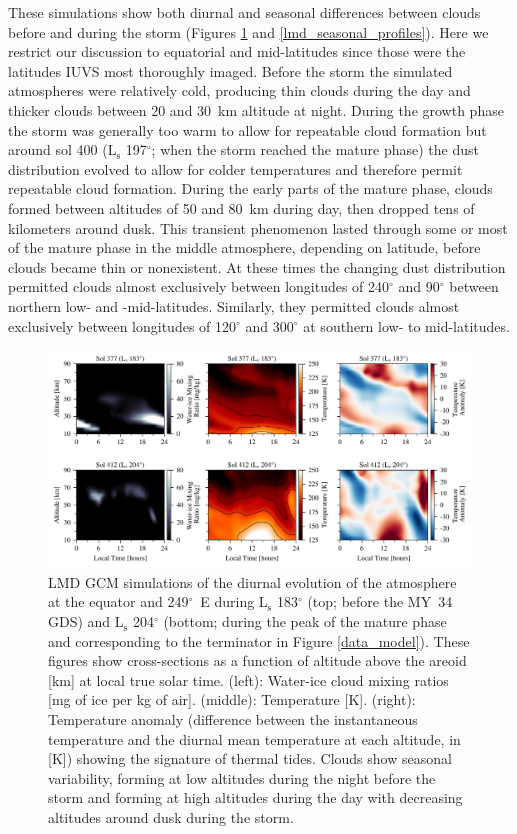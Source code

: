 \documentclass[draft]{agujournal2019}
\begin{document}
These simulations show both diurnal and seasonal differences between clouds before and during the storm (Figures \ref{lmd_diurnal_profiles} and \ref{lmd_seasonal_profiles}). Here we restrict our discussion to equatorial and mid-latitudes since those were the latitudes IUVS most thoroughly imaged. Before the storm the simulated atmospheres were relatively cold, producing thin clouds during the day and thicker clouds between 20 and 30~km altitude at night. During the growth phase the storm was generally too warm to allow for repeatable cloud formation but around sol 400 ($\mathrm{L_s}$ 197$^\circ$; when the storm reached the mature phase) the dust distribution evolved to allow for colder temperatures and therefore permit repeatable cloud formation. During the early parts of the mature phase, clouds formed between altitudes of 50 and 80~km during day, then dropped tens of kilometers around dusk. This transient phenomenon lasted through some or most of the mature phase in the middle atmosphere, depending on latitude, before clouds became thin or nonexistent. At these times the changing dust distribution permitted clouds almost exclusively between longitudes of 240$^\circ$ and 90$^\circ$ between northern low- and -mid-latitudes. Similarly, they permitted clouds almost exclusively between longitudes of 120$^\circ$ and 300$^\circ$ at southern low- to mid-latitudes.

\begin{figure}[ht!]
    \centerline{\includegraphics[width=\textwidth]{lmd_2018_dust_storm_diurnal_profiles.pdf}}
    \caption{LMD GCM simulations of the diurnal evolution of the atmosphere at the equator and 249$^\circ$~E during $\mathrm{L_s}$ 183$^\circ$ (top; before the MY~34 GDS) and $\mathrm{L_s}$ 204$^\circ$ (bottom; during the peak of the mature phase and corresponding to the terminator in Figure \ref{data_model}). These figures show cross-sections as a function of altitude above the areoid [km] at local true solar time. (left): Water-ice cloud mixing ratios [mg of ice per kg of air]. (middle): Temperature [K]. (right): Temperature anomaly (difference between the instantaneous temperature and the diurnal mean temperature at each altitude, in [K]) showing the signature of thermal tides. Clouds show seasonal variability, forming at low altitudes during the night before the storm and forming at high altitudes during the day with decreasing altitudes around dusk during the storm.}
    \label{lmd_diurnal_profiles}
\end{figure}
\end{document}
